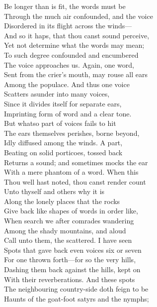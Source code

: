 Be longer than is fit, the words must be\\
Through the much air confounded, and the voice\\
Disordered in its flight across the winds—\\
And so it haps, that thou canst sound perceive,\\
Yet not determine what the words may mean;\\
To such degree confounded and encumbered\\
The voice approaches us. Again, one word,\\
Sent from the crier's mouth, may rouse all ears\\
Among the populace. And thus one voice\\
Scatters asunder into many voices,\\
Since it divides itself for separate ears,\\
Imprinting form of word and a clear tone.\\
But whatso part of voices fails to hit\\
The ears themselves perishes, borne beyond,\\
Idly diffused among the winds. A part,\\
Beating on solid porticoes, tossed back\\
Returns a sound; and sometimes mocks the ear\\
With a mere phantom of a word. When this\\
Thou well hast noted, thou canst render count\\
Unto thyself and others why it is\\
Along the lonely places that the rocks\\
Give back like shapes of words in order like,\\
When search we after comrades wandering\\
Among the shady mountains, and aloud\\
Call unto them, the scattered. I have seen\\
Spots that gave back even voices six or seven\\
For one thrown forth—for so the very hills,\\
Dashing them back against the hills, kept on\\
With their reverberations. And these spots\\
The neighbouring country-side doth feign to be\\
Haunts of the goat-foot satyrs and the nymphs;\\
